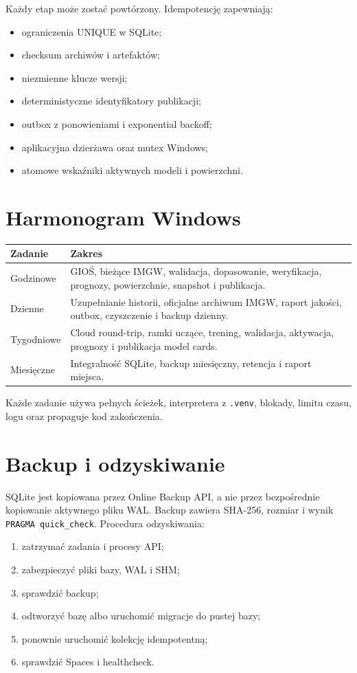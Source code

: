 \documentclass[11pt,a4paper,oneside]{article}
\begin{document}
Każdy etap może zostać powtórzony. Idempotencję zapewniają:
\begin{itemize}[nosep]
  \item ograniczenia UNIQUE w SQLite;
  \item checksum archiwów i artefaktów;
  \item niezmienne klucze wersji;
  \item deterministyczne identyfikatory publikacji;
  \item outbox z ponowieniami i exponential backoff;
  \item aplikacyjna dzierżawa oraz mutex Windows;
  \item atomowe wskaźniki aktywnych modeli i powierzchni.
\end{itemize}

\section{Harmonogram Windows}

\begin{longtable}{@{}p{35mm}p{90mm}@{}}
\toprule
Zadanie & Zakres \\
\midrule
Godzinowe & GIOŚ, bieżące IMGW, walidacja, dopasowanie, weryfikacja, prognozy,
powierzchnie, snapshot i publikacja. \\
Dzienne & Uzupełnianie historii, oficjalne archiwum IMGW, raport jakości,
outbox, czyszczenie i backup dzienny. \\
Tygodniowe & Cloud round-trip, ramki uczące, trening, walidacja, aktywacja,
prognozy i publikacja model cards. \\
Miesięczne & Integralność SQLite, backup miesięczny, retencja i raport miejsca. \\
\bottomrule
\end{longtable}

Każde zadanie używa pełnych ścieżek, interpretera z \texttt{.venv}, blokady,
limitu czasu, logu oraz propaguje kod zakończenia.

\section{Backup i odzyskiwanie}

SQLite jest kopiowana przez Online Backup API, a nie przez bezpośrednie
kopiowanie aktywnego pliku WAL. Backup zawiera SHA-256, rozmiar i wynik
\texttt{PRAGMA quick\_check}. Procedura odzyskiwania:
\begin{enumerate}
  \item zatrzymać zadania i procesy API;
  \item zabezpieczyć pliki bazy, WAL i SHM;
  \item sprawdzić backup;
  \item odtworzyć bazę albo uruchomić migracje do pustej bazy;
  \item ponownie uruchomić kolekcję idempotentną;
  \item sprawdzić Spaces i healthcheck.
\end{enumerate}
\end{document}
